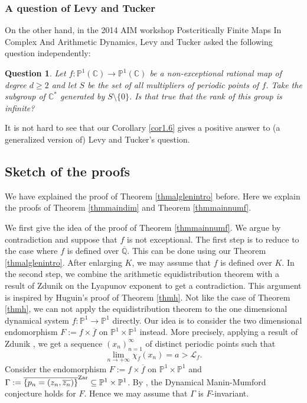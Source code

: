 \documentclass[12pt]{amsart}
\theoremstyle{plain}
\newtheorem{Que}[Thm]{Question}
\theoremstyle{remark}
\theoremstyle{definition}
\def\Q{\mathbb Q}
\def\C{\mathbb C}
\def\P{\mathbb P}
\begin{document}
\subsubsection{A question of Levy and Tucker}
\par On the other hand, in the 2014 AIM workshop Postcritically Finite Maps In Complex And Arithmetic Dynamics, Levy \cite{Levy2014} and Tucker \cite{Tucker2014} asked the following question independently:  
\begin{Que}
Let $f:\P^1(\C)\to\P^1(\C)$ be a non-exceptional rational map of degree $d\geq2$  and let $S$
be the set of all multipliers of periodic points of $f$. Take the subgroup of $\C^\ast$ generated by $S\setminus\{0\}$. Is that true that the rank of this group is infinite? 
\end{Que}


\par It is not hard to see that our Corollary \ref{cor1.6} gives a positive answer to (a generalized version of) Levy and Tucker's question. 


\subsection{Sketch of the proofs}
We have explained the proof of Theorem \ref{thmalglenintro} before. Here we explain the proofs of Theorem \ref{thmmaindim} and Theorem \ref{thmmainnumf}.

\medskip

We first give the idea of the proof of Theorem \ref{thmmainnumf}. 
We argue by contradiction and suppose that $f$ is not exceptional. 
The first step is to reduce to the case where $f$ is defined over $\overline{\Q}$.
This can be done using our Theorem \ref{thmalglenintro}. After enlarging $K$, we may assume that $f$ is defined over $K$. 
In the second step, we combine the arithmetic equidistribution theorem with a result of Zdunik \cite{zdunik2014characteristic} on the Lyapunov exponent to get a contradiction. This argument is inspired by Huguin's proof of Theorem \ref{thmh}. Not like the case of Theorem \ref{thmh}, we can not apply the equidistribution theorem to the one dimensional dynamical system $f:\P^1\to \P^1$ directly. Our idea is
 to consider the two dimensional endomorphism  $F:=f\times\overline{f}$ on $\P^1\times\P^1$ instead.
More precisely, applying a result of Zdunik \cite{zdunik2014characteristic}, we get a sequence $(x_n)_{n=1}^\infty$ of distinct periodic points such that $$\lim\limits_{n\to+\infty}\chi_f(x_n)=a>\mathcal{L}_f.$$ Consider the endomorphism  $F:=f\times\overline{f}$ on $\P^1\times\P^1$ and $\Gamma:=\overline{\{p_n=(z_n,\overline{z_n})\}}^{\rm Zar}\subseteq\P^1\times\P^1$. 
By \cite{Ghioca2011}, the Dynamical Manin-Mumford conjecture holds for $F$. Hence  we may assume that
$\Gamma$ is $F$-invariant. 
\end{document}
